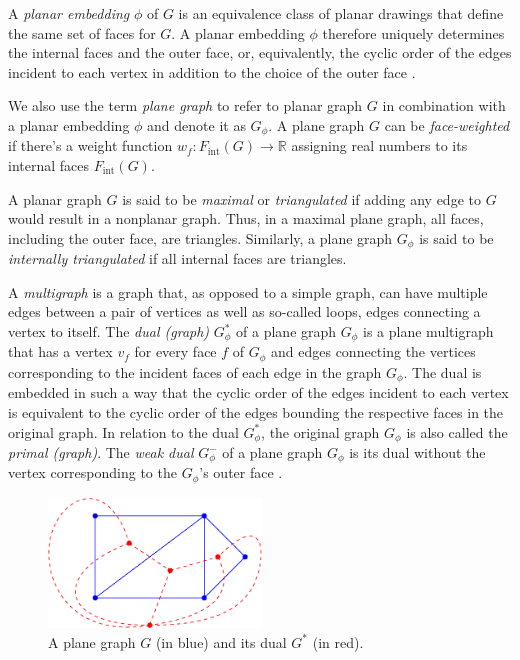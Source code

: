 A \emph{planar embedding} $\phi$ of $G$ is an equivalence class of planar drawings that define the same set of faces for $G$.
A planar embedding $\phi$ therefore uniquely determines the internal faces and the outer face, or, equivalently, the cyclic order of the edges incident to each vertex in addition to the choice of the outer face \cite{angelini2015monotone}.

We also use the term \emph{plane graph} to refer to planar graph $G$ in combination with a planar embedding $\phi$ and denote it as $G_\phi$. A plane graph $G$ can be \emph{face-weighted} if there's a weight function $w_f \colon F_\text{int}(G) \to \mathbb{R}$ assigning real numbers to its internal faces $F_\text{int}(G)$.


A planar graph $G$ is said to be \emph{maximal} or \emph{triangulated} if adding any edge to $G$ would result in a nonplanar graph.
Thus, in a maximal plane graph, all faces, including the outer face, are triangles.
Similarly, a plane graph $G_\phi$ is said to be \emph{internally triangulated} if all internal faces are triangles.

A \emph{multigraph} is a graph that, as opposed to a simple graph, can have multiple edges between a pair of vertices as well as so-called loops, \ie{} edges connecting a vertex to itself.
The \emph{dual (graph)} $G_\phi^*$ of a plane graph $G_\phi$ is a plane multigraph that has a vertex $v_f$ for every face $f$ of $G_\phi$ and edges connecting the vertices corresponding to the incident faces of each edge in the graph $G_\phi$.
The dual is embedded in such a way that the cyclic order of the edges incident to each vertex is equivalent to the cyclic order of the edges bounding the respective faces in the original graph.
In relation to the dual $G_\phi^*$, the original graph $G_\phi$ is also called the \emph{primal (graph)}.
The \emph{weak dual} $G_\phi^-$ of a plane graph $G_\phi$ is its dual without the vertex corresponding to the $G_\phi$'s outer face \cite{fleischner1974}.

\begin{figure}[H]
	\centering\includegraphics[height=130px]{Resources/Preliminaries-Dual.pdf}
	\caption{A plane graph $G$ (in blue) and its dual $G^*$ (in red).}
	\label{fig:preliminaries-dual}
\end{figure}


